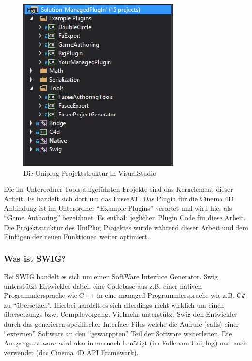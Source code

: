 \documentclass[pagesize, paper=a4, fontsize=12pt, titlepage=true, headings=small, headnosepline, abstractoff, liststotoc, nochapterprefix, plainheadsepline, twoside]{scrreprt}
\newcommand{\CSS}{C\texttt{\# }}
\begin{document}
\begin{figure}[ht]
	\centering
  \includegraphics[width=\linewidth / 2]{Bilder/UniplugVSStruktur.JPG}
	\caption{Die Uniplug Projektstruktur in VisualStudio}
	\label{UniPlugVSStruktur}
\end{figure}
Die im Unterordner Tools aufgeführten Projekte sind das Kernelement dieser Arbeit. Es handelt sich dort um das FuseeAT. Das Plugin für die Cinema 4D Anbindung ist im Unterordner “Example Plugins” verortet und wird hier als “Game Authoring” bezeichnet. Es enthält jeglichen Plugin Code für diese Arbeit. Die Projektstruktur des UniPlug Projektes wurde während dieser Arbeit und dem Einfügen der neuen Funktionen weiter optimiert.

\subsubsection{Was ist SWIG?}
Bei SWIG handelt es sich um einen SoftWare Interface Generator. Swig unterstützt Entwickler dabei, eine Codebase aus z.B. einer nativen Programmiersprache wie C++ in eine managed Programmiersprache wie z.B. \CSS zu “übersetzen”. Hierbei handelt es sich allerdings nicht wirklich um einen übersetzungs bzw. Compilevorgang. Vielmehr unterstützt Swig den Entwickler durch das generieren spezifischer Interface Files welche die Aufrufe (calls) einer “externen” Software an den “gewarppten” Teil der Software weiterleiten. Die Ausgangssoftware wird also immernoch benötigt (im Falle von Uniplug) und auch verwendet (das Cinema 4D API Framework).
\end{document}
